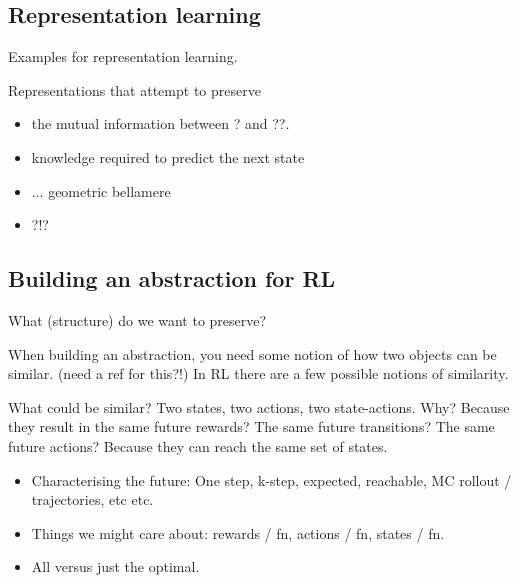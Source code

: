 

\subsection{Representation learning}

Examples for representation learning.

Representations that attempt to preserve
\begin{itemize}
\tightlist
  \item the mutual information between ? and ??.
  \item knowledge required to predict the next state
  \item ... geometric bellamere
  \item ?!?
\end{itemize}



\subsection{Building an abstraction for RL}

What (structure) do we want to preserve?





When building an abstraction, you need some notion of how two objects can be similar. (need a ref for this?!)
In RL there are a few possible notions of similarity.

What could be similar? Two states, two actions, two state-actions. Why?
Because they result in the same future rewards? The same future transitions? The same future actions?
Because they can reach the same set of states.

\begin{itemize}
  \tightlist
  \item Characterising the future: One step, k-step, expected, reachable, MC rollout / trajectories, etc etc.
  \item Things we might care about: rewards / fn, actions / fn, states / fn.
  \item All versus just the optimal.
\end{itemize}

